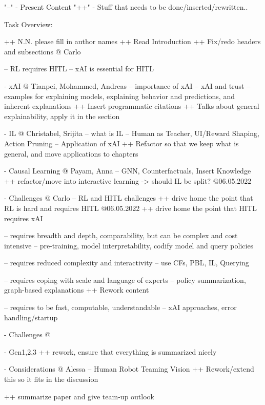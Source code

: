 "--" - Present Content
"++" - Stuff that needs to be done/inserted/rewritten..


Task Overview:

++ N.N. please fill in author names
++ Read Introduction
++ Fix/redo headers and subsections @ Carlo

-- RL requires HITL
-- xAI is essential for HITL

- xAI @ Tianpei, Mohammed, Andreas
-- importance of xAI
-- xAI and trust 
-- examples for explaining models, explaining behavior and predictions, and inherent explanations
++ Insert programmatic citations
++ Talks about general explainability, apply it in the section

- IL @ Christabel, Srijita
-- what is IL
-- Human as Teacher, UI/Reward Shaping, Action Pruning
-- Application of xAI
++ Refactor so that we keep what is general, and move applications to chapters

- Causal Learning @ Payam, Anna
-- GNN, Counterfactuals, Insert Knowledge
++ refactor/move into interactive learning -> should IL be split? @06.05.2022

- Challenges @ Carlo
-- RL and HITL challenges
++ drive home the point that RL is hard and requires HITL @06.05.2022
++ drive home the point that HITL requires xAI


-- requires breadth and depth, comparability, but can be complex and cost intensive
-- pre-training, model interpretability, codify model and query policies

-- requires reduced complexity and interactivity
-- use CFs, PBL, IL, Querying

-- requires coping with scale and language of experts
-- policy summarization, graph-based explanations
++ Rework content

-- requires to be fast, computable, understandable
-- xAI approaches, error handling/startup

- Challenges @ 

- Gen1,2,3
++ rework, ensure that everything is summarized nicely

- Considerations @ Alessa
-- Human Robot Teaming Vision
++ Rework/extend this so it fits in the discussion

++ summarize paper and give team-up outlook